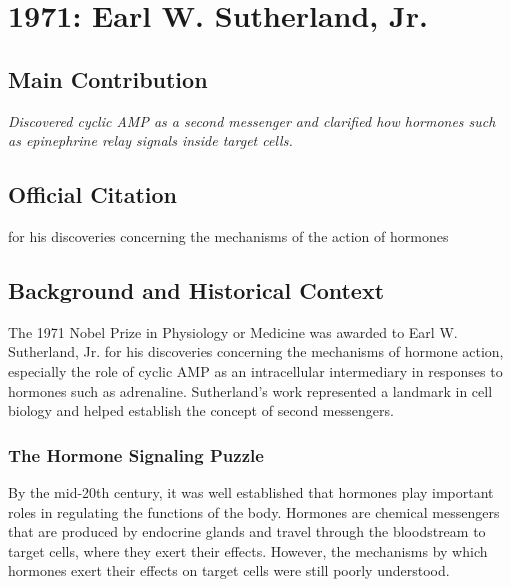 \chapter[1971 --- Sutherland]{1971: Earl W. Sutherland, Jr.}
\label{ch:1971_earlwsutherlandjr}

\section*{Main Contribution}

\textit{Discovered cyclic AMP as a second messenger and clarified how hormones such as epinephrine relay signals inside target cells.}\cite{nobel-1971,lecture-1971}

\section{Official Citation}

for his discoveries concerning the mechanisms of the action of hormones

\section{Background and Historical Context}

The 1971 Nobel Prize in Physiology or Medicine was awarded to Earl W. Sutherland, Jr. for his discoveries concerning the mechanisms of hormone action, especially the role of cyclic AMP as an intracellular intermediary in responses to hormones such as adrenaline. Sutherland's work represented a landmark in cell biology and helped establish the concept of second messengers.

\subsection{The Hormone Signaling Puzzle}

By the mid-20th century, it was well established that hormones play important roles in regulating the functions of the body. Hormones are chemical messengers that are produced by endocrine glands and travel through the bloodstream to target cells, where they exert their effects. However, the mechanisms by which hormones exert their effects on target cells were still poorly understood.

